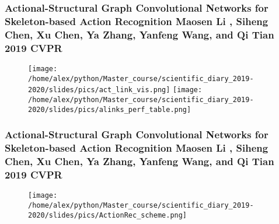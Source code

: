 \documentclass[fleqn, xcolor=x11names]{beamer}
\begin{document}
\begin{frame}\frametitle{\footnotesize{Actional-Structural Graph Convolutional Networks for Skeleton-based Action Recognition 
Maosen Li , Siheng Chen, Xu Chen, Ya Zhang, Yanfeng Wang, and Qi Tian 2019 CVPR 
}}

\begin{figure}[h]
\begin{center}
\texttt{[image: /home/alex/python/Master\_course/scientific\_diary\_2019-2020/slides/pics/act\_link\_vis.png]}
\texttt{[image: /home/alex/python/Master\_course/scientific\_diary\_2019-2020/slides/pics/alinks\_perf\_table.png]}
\end{center}
\end{figure}

\end{frame}	

\begin{frame}\frametitle{\footnotesize{Actional-Structural Graph Convolutional Networks for Skeleton-based Action Recognition 
Maosen Li , Siheng Chen, Xu Chen, Ya Zhang, Yanfeng Wang, and Qi Tian 2019 CVPR 
}}

\begin{figure}[h]
\begin{center}
\texttt{[image: /home/alex/python/Master\_course/scientific\_diary\_2019-2020/slides/pics/ActionRec\_scheme.png]}
\end{center}
\end{figure}

\end{frame}	
\end{document}
